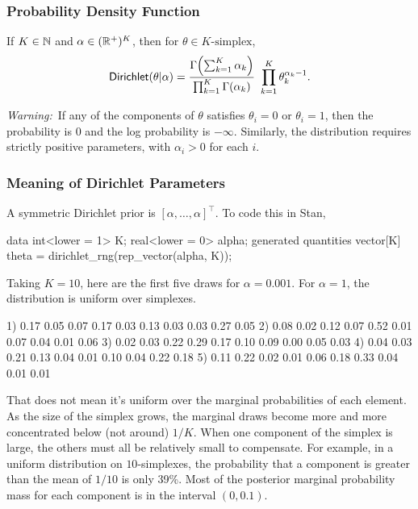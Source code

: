 \subsubsection{Probability Density Function}

If $K \in \mathbb{N}$ and $\alpha \in (\mathbb{R}^+)^{K}$, then for
$\theta \in \mbox{$K$-simplex}$,
\[
\mbox{\sf Dirichlet}(\theta|\alpha)
=
\frac{\Gamma \! \left( \sum_{k=1}^K \alpha_k \right)}
     {\prod_{k=1}^K \Gamma(\alpha_k)}
\
\prod_{k=1}^K \theta_k^{\alpha_k - 1}
.
\]

{\it Warning:}\ If any of the components of $\theta$ satisfies
$\theta_i = 0$ or $\theta_i = 1$, then the probability is 0 and the log
probability is $-\infty$.  Similarly, the distribution requires
strictly positive parameters, with $\alpha_i > 0$ for each $i$.

\subsubsection{Meaning of Dirichlet Parameters}

A symmetric Dirichlet prior is $[\alpha, \ldots, \alpha]^{\top}$.  To
code this in Stan,

\begin{stancode}
data {
  int<lower = 1> K;
  real<lower = 0> alpha;
}
generated quantities {
  vector[K] theta = dirichlet_rng(rep_vector(alpha, K));
}
\end{stancode}

Taking $K = 10$, here are the first five draws for
$\alpha = 0.001$.
For $\alpha = 1$, the distribution is uniform over simplexes.
%
\begin{stancode}
1) 0.17 0.05 0.07 0.17 0.03 0.13 0.03 0.03 0.27 0.05
2) 0.08 0.02 0.12 0.07 0.52 0.01 0.07 0.04 0.01 0.06
3) 0.02 0.03 0.22 0.29 0.17 0.10 0.09 0.00 0.05 0.03
4) 0.04 0.03 0.21 0.13 0.04 0.01 0.10 0.04 0.22 0.18
5) 0.11 0.22 0.02 0.01 0.06 0.18 0.33 0.04 0.01 0.01
\end{stancode}
%
That does not mean it's uniform over the marginal probabilities of
each element.  As the size of the simplex grows, the marginal draws
become more and more concentrated below (not around) $1/K$.  When one
component of the simplex is large, the others must all be relatively
small to compensate.  For example, in a uniform distribution on
$10$-simplexes, the probability that a component is greater than the
mean of $1/10$ is only 39\%.  Most of the posterior marginal
probability mass for each component is in the interval $(0, 0.1)$.

